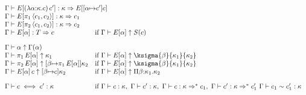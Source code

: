 \documentclass[twoside]{article}
\begin{document}
\newcommand{\weakconequiv}[4]{#1\vdash #2 \sim #3 : #4}
\newcommand{\conequiv}[4]{#1\vdash #2 \iff #3 : #4}
\newcommand{\headnormto}[4]{#1\vdash #2 : #3 \Rightarrow #4}
\newcommand{\headnormsto}[4]{#1\vdash #2 : #3 \Rightarrow^{*} #4}
\newcommand{\reconstruct}[3]{#1\vdash #2 \uparrow #3}
\[
\begin{array}{ll}
\headnormto{\context}
   {E[\capply{(\cfunction{\cvar}{\kind}{\constructor})}
             {\constructor'}]}
   {\kind}
   {E[\substitute{\cvar}{\constructor'}{\constructor}]}\hidewidth\\
\headnormto{\context}
   {E[\cpi{1}{\cpair{\constructor_1}{\constructor_2}}]}
   {\kind}
   {\constructor_1}\\
\headnormto{\context}
   {E[\cpi{2}{\cpair{\constructor_1}{\constructor_2}}]}
   {\kind}
   {\constructor_2}\\
\headnormto{\context}{E[\cvar]}{\ktype}{\constructor}&
   \mbox{if}\ 
   \reconstruct{\context}{E[\cvar]}{\ksingleton{\constructor}}\\[10pt]

\reconstruct{\context}{\cvar}{\context(\cvar)}\\
\reconstruct{\context}{\cpi{1}{E[\cvar]}}{\kind_1}&
  \mbox{if}\
  \reconstruct{\context}{E[\cvar]}{\ksigma{\beta}{\kind_1}{\kind_2}}\\
\reconstruct{\context}{\cpi{2}{E[\cvar]}}
  {\substitute{\beta}{\cpi{1}{E[\cvar]}}\kind_2}&
  \mbox{if}\
  \reconstruct{\context}{E[\cvar]}{\ksigma{\beta}{\kind_1}{\kind_2}}\\
\reconstruct{\context}{\capply{E[\cvar]}{\constructor}}
  {\substitute{\beta}{\constructor}{\kind_2}}&
  \mbox{if}\ 
  \reconstruct{\context}{E[\cvar]}{\kpi{\beta}{\kind_1}{\kind_2}}\\[10pt]

\conequiv{\context}{\constructor}{\constructor'}{\kind}&
  \mbox{if}\ 
    \validconstructor{\context}{\constructor}{\kind},\
    \validconstructor{\context}{\constructor'}{\kind},\
    \headnormsto{\context}{\constructor}{\kind}{\constructor_1},\
    \headnormsto{\context}{\constructor'}{\kind}{\constructor'_1}\
    \weakconequiv{\context}{\constructor_1}{\constructor'_1}{\kind}\\[10pt]


\end{array}\]
\end{document}
